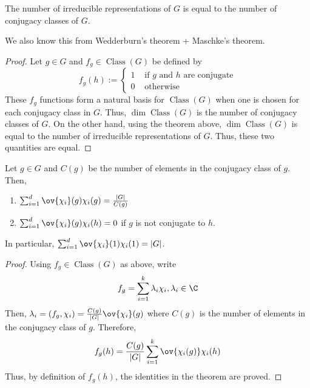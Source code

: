 \documentclass[11pt,leqno,oneside]{amsbook}
\newcommand{\Class}{\operatorname{Class}}
\numberwithin{thm}{section}
\begin{document}
\begin{cor}
  The number of irreducible
  representations of \(G\) is equal to the number of
  conjugacy classes of \(G\).
\end{cor}
\begin{rmk}
  We also know this from Wedderburn's theorem + Maschke's theorem.
\end{rmk}
\begin{proof}
  Let \(g \in G\) and \(f_g \in \Class(G)\) be defined by \[
    f_g(h) :=
    \begin{cases}
      1 & \text{ if }g \text{ and }h\text{ are conjugate} \\
      0 & \text{ otherwise}
    \end{cases}
  \]
  These \(f_g\) functions form a natural basis for \(\Class(G)\) when
  one is chosen for each conjugacy class in \(G\). Thus, \(\dim
  \Class(G)\) is the number of conjugacy classes of \(G\). On the
  other hand, using the theorem above, \(\dim \Class(G)\) is equal to
  the number of irreducible representations of \(G\). Thus, these two
  quantities are equal.
\end{proof}
\begin{thm}\label{2nd-ortho-reln}
  Let \(g \in G\) and \(C(g)\) be the number of elements in the
  conjugacy class of \(g\). Then,
  \begin{enumerate}
  \item \(\sum_{i=1}^d \ov{\chi_i}(g) \chi_i(g) = \frac{|G|}{C(g)}\)
  \item \(\sum_{i=1}^d \ov{\chi_i}(g) \chi_i(h) = 0\) if \(g\) is not
    conjugate to \(h\).
  \end{enumerate}
\end{thm}
\begin{rmk}\label{sum-of-squares-is-ord-G}
  In particular, \(\sum_{i=1}^d \ov{\chi_i}(1)\chi_i(1) = |G|\).
\end{rmk}
\begin{proof}
  Using \(f_g \in \Class(G)\) as above, write \[
    f_g = \sum_{i=1}^k \lambda_i \chi_i, \lambda_i \in \C
  \]
  Then, \(\lambda_i = (f_g, \chi_i) = \frac{C(g)}{|G|}
  \ov{\chi_i}(g)\) where \(C(g)\) is the number of elements in the
  conjugacy class of \(g\). Therefore, \[
    f_g(h) = \frac{C(g)}{|G|} \sum_{i=1}^k \ov{\chi_i(g)} \chi_i(h)
  \]
  Thus, by definition of \(f_g(h)\), the identities in the theorem are proved.
\end{proof}
\end{document}
